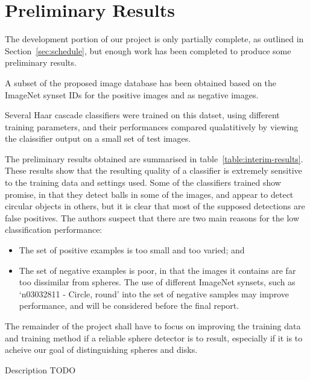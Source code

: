 \documentclass[11pt]{scrartcl}
\begin{document}
    \section{Preliminary Results} {
    \label{sec:results}

        The development portion of our project is only partially complete, as outlined in Section~\ref{sec:schedule}, but enough work has been completed to produce some preliminary results.

        A subset of the proposed image database has been obtained based on the ImageNet synset IDs  for the positive images and  as negative images.

        Several Haar cascade classifiers were trained on this datset, using different training parameters, and their performances compared qualatitively by viewing the claissifier output on a small set of test images.

        The preliminary results obtained are summarised in table~\ref{table:interim-results}.
        These results show that the resulting quality of a classifier is extremely sensitive to the training data and settings used.
        Some of the classifiers trained show promise, in that they detect balls in some of the images, and appear to detect circular objects in others, but it is clear that most of the supposed detections are false positives.
        The authors suspect that there are two main reasons for the low classification performance:

        \begin{itemize}
            \item The set of positive examples is too small and too varied; and
            \item The set of negative examples is poor, in that the images it contains are far too dissimilar from spheres.
                  The use of different ImageNet synsets, such as `n03032811 - Circle, round' into the set of negative samples may improve performance, and will be considered before the final report.
        \end{itemize}

        The remainder of the project shall have to focus on improving the training data and training method if a reliable sphere detector is to result, especially if it is to acheive our goal of distinguishing spheres and disks.


        \begin{table}[H]
            \label{table:interim-results}
            \centering
            \makebox[\textwidth][c]{\resizebox{0.5\paperwidth}{!}{}}
            \caption{Description TODO}
        \end{table}

    }
\end{document}
